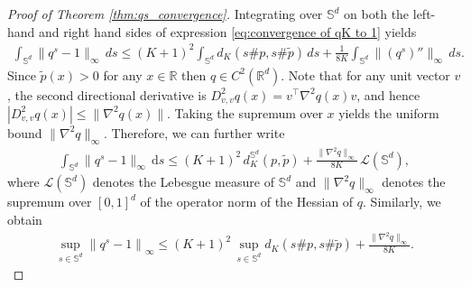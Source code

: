 \documentclass{article}
\begin{document}
\begin{proof}[Proof of Theorem \ref{thm:qs_convergence}] 

    Integrating over $\mathbb{S}^{d}$ on both the left-hand and right hand sides of expression \eqref{eq:convergence of qK to 1} yields
    \begin{align*}
    \int_{\mathbb{S}^{d}} \|q^s - 1\|_\infty\, ds \le (K+1)^2 \int_{\mathbb{S}^{d}} d_K(s\#p, s\#\tilde{p})\, ds + \frac{1}{8K}\int_{\mathbb{S}^{d}} \|(q^s)''\|_\infty\, ds.
    \end{align*}
    Since $\tilde{p}(x)>0$ for any $x\in\mathbb{R}$ then \(q\in C^2(\mathbb{R}^d)\). Note that for any unit vector \(v\), the second directional derivative is \(D^2_{v,v}q(x) = v^\top \nabla^2q(x)v\), and hence \(|D^2_{v,v}q(x)| \le \|\nabla^2q(x)\|\). Taking the supremum over \(x\) yields the uniform bound \(\|\nabla^2q\|_\infty\).  Therefore, we can further write
    \begin{align*}
    \int_{\mathbb{S}^{d}} \|q^s - 1\|_\infty\, \mathrm{d}s \le (K+1)^2\, d_K^{\mathbb{S}^{d}}(p,\tilde{p}) + \frac{\|\nabla^2 q\|_\infty}{8K}\, \mathcal{L}(\mathbb{S}^{d}),
    \end{align*}
    where $\mathcal{L}(\mathbb{S}^{d})$ denotes the Lebesgue measure of $\mathbb{S}^{d}$ and $\|\nabla^2 q\|_\infty$ denotes the supremum over $[0,1]^d$ of the operator norm of the Hessian of $q$.
    Similarly, we obtain
    \begin{align*}
    \sup_{s\in \mathbb{S}^{d}} \left\|q^{s}-1\right\|_{\infty} \le (K+1)^{2} \, \sup_{s\in \mathbb{S}^{d}} d_{K}(s\#p, s\#\tilde{p}) + \frac{\|\nabla^{2} q\|_{\infty}}{8K}.
    \end{align*}


\end{proof}
\end{document}
